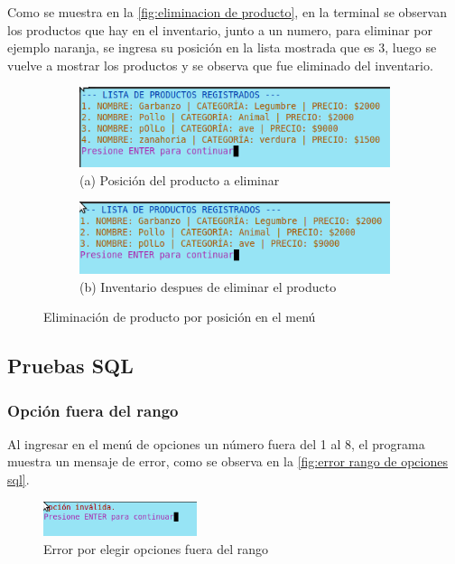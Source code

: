 \documentclass[12pt]{article}
\begin{document}
Como se muestra en la \autoref{fig:eliminacion de producto}, en la terminal se observan los productos que hay en el inventario, junto a un numero, para eliminar por ejemplo naranja, se ingresa su posición en la lista mostrada que es $3$, luego se vuelve a mostrar los productos y se observa que fue eliminado del inventario.
\begin{figure}[H]
    \centering

    \begin{subfigure}[b]{0.6\textwidth}
        \centering
        \includegraphics[width=\textwidth]{Imagenes/pre_eliminacion.png}
        \caption*{(a) Posición del producto a eliminar}
    \end{subfigure}
    \hfill
    \begin{subfigure}[b]{0.6\textwidth}
        \centering
        \includegraphics[width=\textwidth]{Imagenes/post_eliminacion.png}
        \caption*{(b) Inventario despues de eliminar el producto}
    \end{subfigure}

    \caption{Eliminación de producto por posición en el menú}
    \label{fig:eliminacion de producto}
\end{figure}

\subsection{Pruebas SQL}
\subsubsection{Opción fuera del rango}

Al ingresar en el menú de opciones un número fuera del 1 al 8, el programa muestra un mensaje de error, como se observa en la \autoref{fig:error rango de opciones sql}.
\begin{figure}[H]
	\centering
	\setlength{\fboxrule}{0pt}
	\includegraphics[width=0.4\textwidth]{Imagenes/opcion_invalida_sql.png}
	\caption{Error por elegir opciones fuera del rango}
	\label{fig:error rango de opciones sql}
\end{figure} 
\end{document}
